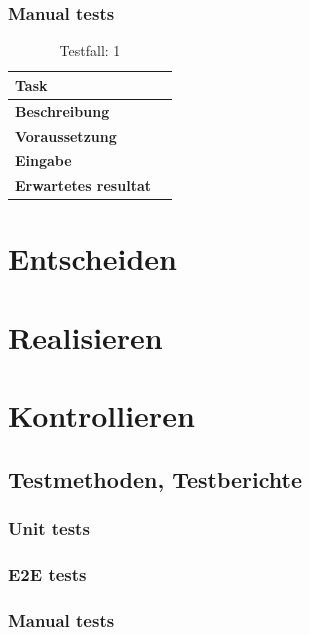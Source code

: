 \documentclass{report}
\begin{document}
\subsubsection{Manual tests}

\begin{table}[htb]
\caption{Testfall: 1}
\begin{tabularx}{\textwidth}{|X|X|}
 \hline
 \textbf{Task} &   \\
 \hline
 \textbf{Beschreibung} &   \\
  \hline
 \textbf{Voraussetzung} &   \\
 \hline
 \textbf{Eingabe} &  \\
 \hline
 \textbf{Erwartetes resultat} &   \\
\hline
\end{tabularx}

\end{table}


\section{Entscheiden}


\section{Realisieren}


\section{Kontrollieren}

\subsection{Testmethoden, Testberichte}

\subsubsection{Unit tests}
\subsubsection{E2E tests}
\subsubsection{Manual tests}
\end{document}
